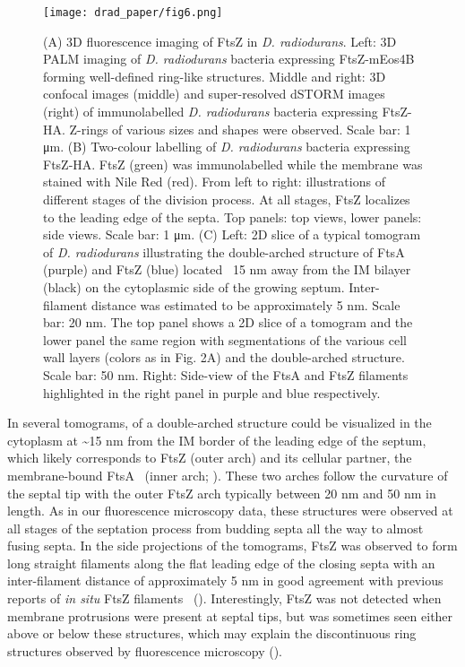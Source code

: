 \begin{figure}
    \centering
    \texttt{[image: drad\_paper/fig6.png]}
    \label{drad_fig6}
\end{figure}
\begin{figure}
    \ContinuedFloat
    \caption[]{(A) 3D fluorescence imaging of FtsZ in \textit{D. radiodurans}. Left: 3D PALM imaging of \textit{D. radiodurans} bacteria expressing FtsZ-mEos4B forming well-defined ring-like structures. Middle and right: 3D confocal images (middle) and super-resolved dSTORM images (right) of immunolabelled \textit{D. radiodurans} bacteria expressing FtsZ-HA. Z-rings of various sizes and shapes were observed. Scale bar: 1 μm. (B) Two-colour labelling of \textit{D. radiodurans} bacteria expressing FtsZ-HA. FtsZ (green) was immunolabelled while the membrane was stained with Nile Red (red). From left to right: illustrations of different stages of the division process. At all stages, FtsZ localizes to the leading edge of the septa. Top panels: top views, lower panels: side views. Scale bar: 1 μm. (C) Left: 2D slice of a typical tomogram of \textit{D. radiodurans} illustrating the double-arched structure of FtsA (purple) and FtsZ (blue) located ~15 nm away from the IM bilayer (black) on the cytoplasmic side of the growing septum. Inter-filament distance was estimated to be approximately 5 nm. Scale bar: 20 nm. The top panel shows a 2D slice of a tomogram and the lower panel the same region with segmentations of the various cell wall layers (colors as in Fig. 2A) and the double-arched structure. Scale bar: 50 nm. Right: Side-view of the FtsA and FtsZ filaments highlighted in the right panel in purple and blue respectively.}
\end{figure}

In several tomograms, of a double-arched structure could be visualized in the cytoplasm at \sim15 nm from the IM border of the leading edge of the septum, which likely corresponds to FtsZ (outer arch) and its cellular partner, the membrane-bound FtsA~\cite{sextonSuperresolutionConfocalCryoCLEM2022} (inner arch; ).
These two arches follow the curvature of the septal tip with the outer FtsZ arch typically between 20 nm and 50 nm in length.
As in our fluorescence microscopy data, these structures were observed at all stages of the septation process from budding septa all the way to almost fusing septa.
In the side projections of the tomograms, FtsZ was observed to form long straight filaments along the flat leading edge of the closing septa with an inter-filament distance of approximately 5 nm in good agreement with previous reports of \textit{in situ} FtsZ filaments~\cite{liStructureFtsZFilaments2007,szwedziakArchitectureRingFormed2014} ().
Interestingly, FtsZ was not detected when membrane protrusions were present at septal tips, but was sometimes seen either above or below these structures, which may explain the discontinuous ring structures observed by fluorescence microscopy ().

